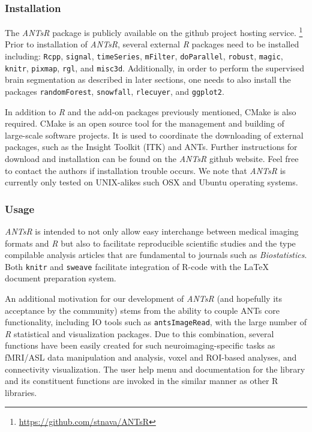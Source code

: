 \subsubsection{Installation}

The \textit{ANTsR} package is publicly available on the github project hosting service.%
\footnote{
\href{https://github.com/stnava/ANTsR}{https://github.com/stnava/ANTsR}
}
Prior to installation of \textit{ANTsR}, several external \textit{R} packages
need to be installed including: \verb#Rcpp#, \verb#signal#, \verb#timeSeries#, 
\verb#mFilter#, \verb#doParallel#, \verb#robust#, \verb#magic#, \verb#knitr#, \verb#pixmap#, 
\verb#rgl#, and \verb#misc3d#.
Additionally, in order
to perform the supervised brain segmentation as described 
in later sections, one needs to also install the packages
\verb#randomForest#, \verb#snowfall#, \verb#rlecuyer#,
and \verb#ggplot2#.

In addition to \textit{R} and the add-on packages previously mentioned, CMake is also 
required.  CMake
is an open source tool for the management and building of 
large-scale software projects.  It is used
to coordinate the downloading of external packages,
such as the Insight Toolkit (ITK)
and ANTs.  Further instructions for download and
installation can be found on the \textit{ANTsR} github website.  Feel
free to contact the authors if installation trouble occurs.  We note
that \textit{ANTsR} is currently only tested on UNIX-alikes such OSX and Ubuntu
operating systems.

\subsubsection{Usage}
\textit{ANTsR} is intended to not only allow easy interchange between
medical imaging formats and \textit{R} but also to facilitate
reproducible scientific studies and the type compilable analysis
articles that are fundamental to journals such as
\textit{Biostatistics}.  Both \verb#knitr# and \verb#sweave#
facilitate integration of R-code with the LaTeX document
preparation system.  

An additional motivation for our development of \textit{ANTsR} (and
hopefully its acceptance by the community) 
stems from the ability to couple ANTs core 
functionality, including IO tools such as \verb#antsImageRead#, 
with the large number of \textit{R} statistical and
visualization packages.  Due to this combination, several
functions have been easily created for such neuroimaging-specific 
tasks as fMRI/ASL data manipulation and analysis,
voxel and ROI-based  analyses,
and connectivity visualization. %
The user help menu and documentation for the library  and its
constituent functions are invoked in the similar manner as other
R libraries.

